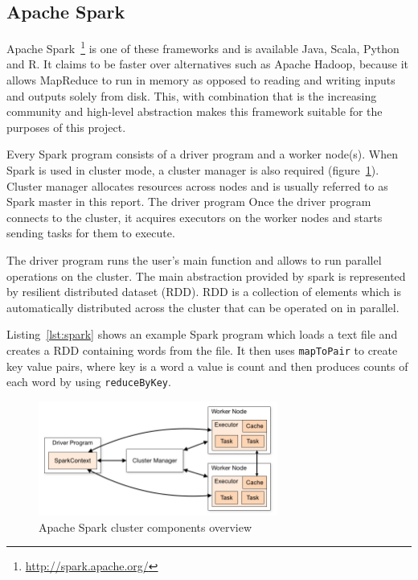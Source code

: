 \documentclass{l4proj}
\begin{document}
\subsection{Apache Spark}

Apache Spark~\footnote{\url{http://spark.apache.org/}} is one of these frameworks and is available Java, Scala, Python and R. It claims
to be faster over alternatives such as Apache Hadoop, because it allows MapReduce to run in
memory as opposed to reading and writing inputs and outputs solely from disk. This, with combination
that is the increasing community and high-level abstraction makes this framework suitable for the purposes
of this project.  

Every Spark program consists of a driver program and a worker node(s). When Spark is
used in cluster mode, a cluster manager is also required (figure~\ref{fig:spark}). Cluster manager allocates resources
across nodes and is usually referred to as Spark master in this report. The driver program
Once the driver program connects to the cluster, it acquires executors on the worker nodes and
starts sending tasks for them to execute.

The driver program runs the user's main function and allows to run parallel operations on the cluster.
The main abstraction provided by spark is represented by resilient distributed dataset (RDD). RDD is
a collection of elements which is automatically distributed across the cluster that can be operated on
in parallel.

Listing~\ref{lst:spark} shows an example Spark program which loads a text file and creates a RDD
containing words from the file. It then uses \texttt{mapToPair} to create key value pairs, where 
key is a word a value is count and then produces counts of each word by using \texttt{reduceByKey}.

\begin{figure}
\centering
\includegraphics[width=0.7\textwidth]{images/spark.png}
\caption{Apache Spark cluster components overview ~\protect\footnotemark}
\label{fig:spark}
\end{figure}
\end{document}
